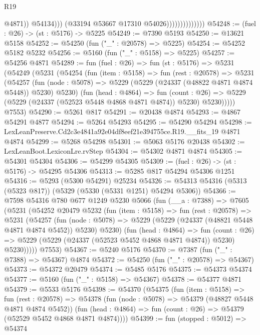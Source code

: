 \begin{lexlean}{R19}
\begin{coremodule}
                                        @4871))
                                    @54134)))
                              (@33194 @53667 @17310 @54026))))))))))))))
@54248 := (fuel : @26) -> (st : @5176) -> @5225
@54249 := @7390 @5193
@54250 := @13621 @5158
@54252 := @54250 (fun ("_" : @20578) => @5225)
@54254 := @54252 @5182 @5232
@54256 := @5160 (fun ("_" : @5158) => @5225)
@54257 := @54256 @4871
@54289 := fun (fuel : @26) =>
  fun (st : @5176) =>
  @5231
    (@54249
      (@5231
        (@54254
          (fun (item : @5158) =>
          fun (rest : @20578) =>
          @5231
            (@54257
              (fun (node : @5078) => @5229 (@5229 (@24337 (@48822 @4871 @4874 @5448)) @5230) @5230)
              (fun (head : @4864) =>
              fun (count : @26) =>
              @5229 (@5229 (@24337 (@52523 @5448 @4868 @4871 @4874)) @5230) @5230)))))
      @7553)
@54290 := @5261 @817
@54291 := @20438 @4874
@54293 := @4867 @54291 @4877
@54294 := @5264 @54293
@54295 := @54290 @54294
@54298 := LexLeanPreserve.Cd2c3e4841a92e04df8eef21e394755ce.R19.__fits_19 @4871 @4874
@54299 := @5268 @54298
@54301 := @5063 @5176 @20438
@54302 := LexLeanBoot.LexiconLre.rvStep
@54304 := @54302 @4871 @4874
@54305 := @54301 @54304
@54306 := @54299 @54305
@54309 := (fuel : @26) -> (st : @5176) -> @54295 @54306
@54313 := @5285 @817 @54294 @54306 @1251
@54316 := @5293 (@5300 @54291) @25234
@54326 := @54313 @54316 (@5313 (@5323 @817)) (@5329 (@5330 (@5331 @1251) @54294 @5306))
@54366 := @7598
    @54316
    @780
    @677
    @1249
    @5230
    @5066
    (fun (__a : @7388) =>
    @7605
      (@5231
        (@54252
          @20479
          @5232
          (fun (item : @5158) =>
          fun (rest : @20578) =>
          @5231
            (@54257
              (fun (node : @5078) =>
              @5229 (@5229 (@24337 (@48821 @5448 @4871 @4874 @5452)) @5230) @5230)
              (fun (head : @4864) =>
              fun (count : @26) =>
              @5229 (@5229 (@24337 (@52523 @5452 @4868 @4871 @4874)) @5230) @5230)))))
      @7553)
@54367 := @5240 @5176
@54370 := @7387 (fun ("_" : @7388) => @54367) @4874
@54372 := @54250 (fun ("_" : @20578) => @54367)
@54373 := @54372 @20479
@54374 := @5485 @5176
@54375 := @54373 @54374
@54377 := @5160 (fun ("_" : @5158) => @54367)
@54378 := @54377 @4871
@54379 := @5533 @5176
@54398 := @54370
    (@54375
      (fun (item : @5158) =>
      fun (rest : @20578) =>
      @54378
        (fun (node : @5078) => @54379 (@48827 @5448 @4871 @4874 @5452))
        (fun (head : @4864) => fun (count : @26) => @54379 (@52529 @5452 @4868 @4871 @4874))))
@54399 := fun (stopped : @5012) => @54374

\end{coremodule}
\end{lexlean}
